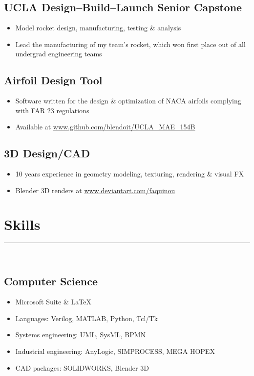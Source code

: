 \documentclass[10pt]{article}
\begin{document}
\subsection*{UCLA Design--Build--Launch Senior Capstone}
\begin{itemize}
    \item Model rocket design, manufacturing, testing \& analysis
    \item Lead the manufacturing of my team's rocket, which won first place out of all undergrad engineering teams
\end{itemize}
\subsection*{Airfoil Design Tool}
\begin{itemize}
    \item Software written for the design \& optimization of NACA airfoils complying with FAR 23 regulations
    \item  Available at \url{www.github.com/blendoit/UCLA_MAE_154B}
\end{itemize}
\subsection*{3D Design/CAD}
\begin{itemize}
    \item 10 years experience in geometry modeling, texturing, rendering \& visual FX
    \item Blender 3D renders at \url{www.deviantart.com/faquinou}
\end{itemize}

\section*{Skills}
\rule{\linewidth}{1pt}\\[0.2cm]
\subsection*{Computer Science}
\begin{itemize}
    \item Microsoft Suite \& \LaTeX\
    \item Languages: Verilog, MATLAB, Python, Tcl/Tk
    \item Systems engineering: UML, SysML, BPMN
    \item Industrial engineering: AnyLogic, SIMPROCESS, MEGA HOPEX
    \item CAD packages: SOLIDWORKS, Blender 3D
\end{itemize}
\end{document}
